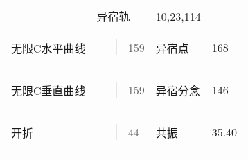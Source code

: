 \begin{longtable}[]{@{}llll@{}}
\begin{minipage}[t]{0.22\columnwidth}
\end{minipage} & \begin{minipage}[t]{0.22\columnwidth}\raggedright
异宿轨\strut
\end{minipage} & \begin{minipage}[t]{0.22\columnwidth}\raggedright
10,23,114\strut
\end{minipage}\tabularnewline
\begin{minipage}[t]{0.22\columnwidth}\raggedright
无限C水平曲线\strut
\end{minipage} & \begin{minipage}[t]{0.22\columnwidth}\raggedright
\begin{quote}
159
\end{quote}\strut
\end{minipage} & \begin{minipage}[t]{0.22\columnwidth}\raggedright
异宿点\strut
\end{minipage} & \begin{minipage}[t]{0.22\columnwidth}\raggedright
168\strut
\end{minipage}\tabularnewline
\begin{minipage}[t]{0.22\columnwidth}\raggedright
无限C垂直曲线\strut
\end{minipage} & \begin{minipage}[t]{0.22\columnwidth}\raggedright
\begin{quote}
159
\end{quote}\strut
\end{minipage} & \begin{minipage}[t]{0.22\columnwidth}\raggedright
异宿分念\strut
\end{minipage} & \begin{minipage}[t]{0.22\columnwidth}\raggedright
146\strut
\end{minipage}\tabularnewline
\begin{minipage}[t]{0.22\columnwidth}\raggedright
开折\strut
\end{minipage} & \begin{minipage}[t]{0.22\columnwidth}\raggedright
\begin{quote}
44
\end{quote}\strut
\end{minipage} & \begin{minipage}[t]{0.22\columnwidth}\raggedright
共振\strut
\end{minipage} & \begin{minipage}[t]{0.22\columnwidth}\raggedright
35.40\strut
\end{minipage}\tabularnewline

\end{longtable}
